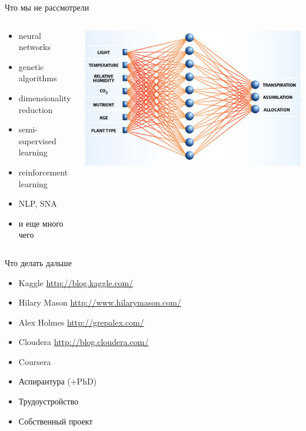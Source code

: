 \documentclass[10pt,a4paper]{beamer}
\begin{document}
\begin{frame}{Что мы не рассмотрели}

\begin{columns}[C]
    \begin{column}{.4\textwidth}
    \begin{itemize}
	\item neural networks
	\item genetic algorithms
	\item dimensionality reduction
	\item semi-supervised learning
	\item reinforcement learning
	\item NLP, SNA
	\item и еще много чего
	\end{itemize}
    \end{column}
    \begin{column}{.6\textwidth} 
	\begin{center}
	\includegraphics[scale=0.3]{images/nn.jpg}
	\end{center}  
    \end{column}
\end{columns}

\end{frame}


\begin{frame}{Что делать дальше}

\begin{itemize}
\item Kaggle \url{http://blog.kaggle.com/}
\item Hilary Mason \url{http://www.hilarymason.com/}
\item Alex Holmes \url{http://grepalex.com/}
\item Cloudera \url{http://blog.cloudera.com/}
\item Coursera
\item Аспирантура (+PhD)
\item Трудоустройство
\item Собственный проект
\end{itemize}

\end{frame}
\end{document}
